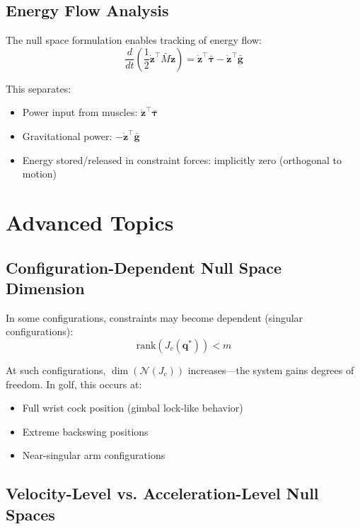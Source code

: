 \documentclass[11pt,a4paper]{article}
\theoremstyle{definition}
\newcommand{\nullspace}{\mathcal{N}}
\newcommand{\Jc}{J_c}
\newcommand{\qvec}{\bm{q}}
\newcommand{\gvec}{\bm{g}}
\newcommand{\tauvec}{\bm{\tau}}
\begin{document}
\subsection{Energy Flow Analysis}

The null space formulation enables tracking of energy flow:
\begin{equation}
    \frac{d}{dt}\left(\frac{1}{2} \dot{\bm{z}}^\top \bar{M} \dot{\bm{z}}\right) = \dot{\bm{z}}^\top \bar{\tauvec} - \dot{\bm{z}}^\top \bar{\gvec}
\end{equation}

This separates:
\begin{itemize}[noitemsep]
    \item Power input from muscles: $\dot{\bm{z}}^\top \bar{\tauvec}$
    \item Gravitational power: $-\dot{\bm{z}}^\top \bar{\gvec}$
    \item Energy stored/released in constraint forces: implicitly zero (orthogonal to motion)
\end{itemize}

\section{Advanced Topics}

\subsection{Configuration-Dependent Null Space Dimension}

In some configurations, constraints may become dependent (singular configurations):
\begin{equation}
    \text{rank}(\Jc(\qvec^*)) < m
\end{equation}

At such configurations, $\dim(\nullspace(\Jc))$ increases---the system gains degrees of freedom. In golf, this occurs at:
\begin{itemize}[noitemsep]
    \item Full wrist cock position (gimbal lock-like behavior)
    \item Extreme backswing positions
    \item Near-singular arm configurations
\end{itemize}

\subsection{Velocity-Level vs. Acceleration-Level Null Spaces}
\end{document}
